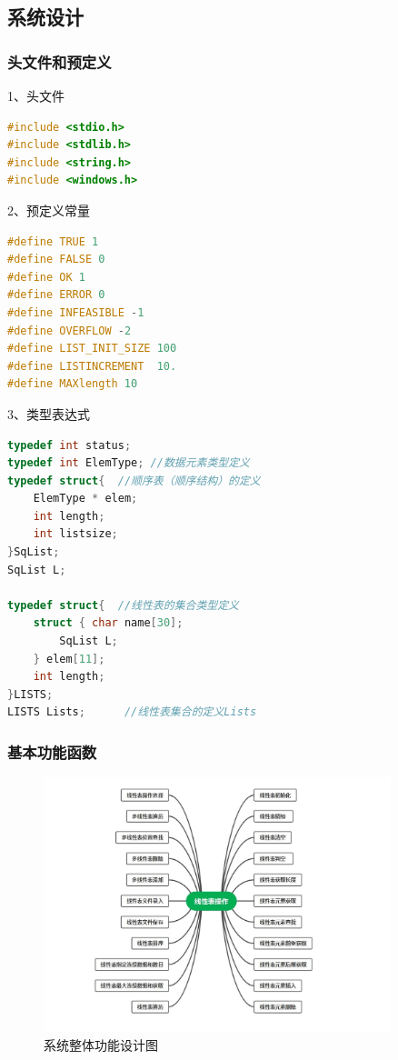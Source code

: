 \documentclass[supercite]{Experimental_Report}
\theoremstyle{definition}
\begin{document}
\subsection{系统设计}

\subsubsection{头文件和预定义}

1、头文件

\begin{lstlisting}[language=c]
#include <stdio.h>
#include <stdlib.h>
#include <string.h>
#include <windows.h>
\end{lstlisting}

2、预定义常量

\begin{lstlisting}[language=c]
#define TRUE 1
#define FALSE 0
#define OK 1
#define ERROR 0
#define INFEASIBLE -1
#define OVERFLOW -2
#define LIST_INIT_SIZE 100
#define LISTINCREMENT  10.
#define MAXlength 10

\end{lstlisting}

3、类型表达式

\begin{lstlisting}[language=c]
typedef int status;
typedef int ElemType; //数据元素类型定义
typedef struct{  //顺序表（顺序结构）的定义
    ElemType * elem;
    int length;
    int listsize;
}SqList;
SqList L;

typedef struct{  //线性表的集合类型定义
    struct { char name[30];
        SqList L;
    } elem[11];
    int length;
}LISTS;
LISTS Lists;      //线性表集合的定义Lists

\end{lstlisting}

\subsubsection{基本功能函数}

 \begin{figure}[H]
 	\centering
 	\includegraphics[width=0.9\textwidth]{images/线性表操作.jpg}
 	\caption{系统整体功能设计图}
 	\label{txlab}
 \end{figure}
\end{document}
